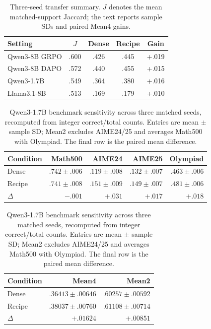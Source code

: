 \documentclass[5p,times]{elsarticle}
\begin{document}
\begin{table}[t]
\centering
\caption{Three-seed transfer summary. $J$ denotes the mean matched-support
Jaccard; the text reports sample SDs and paired Mean4 gains.}
\label{tab:transfer}
\small\setlength{\tabcolsep}{3.5pt}
\begin{tabular}{lcccc}
\toprule Setting & $J$ & Dense & Recipe & Gain\\
\midrule
Qwen3-8B GRPO & .600 & .426 & .445 & +.019\\
Qwen3-8B DAPO & .572 & .440 & .455 & +.015\\
Qwen3-1.7B & .549 & .364 & .380 & +.016\\
Llama3.1-8B & .513 & .169 & .179 & +.010\\
\bottomrule
\end{tabular}
\end{table}

\begin{table}[t]
\centering
\caption{Qwen3-1.7B benchmark sensitivity across three matched seeds, recomputed
from integer correct/total counts. Entries are mean $\pm$ sample SD; Mean2
excludes AIME24/25 and averages Math500 with Olympiad. The final row is the
paired mean difference.}
\label{tab:qwen17}
\scriptsize\setlength{\tabcolsep}{3.3pt}
\begin{tabular}{lrrrr}
\toprule Condition & Math500 & AIME24 & AIME25 & Olympiad\\
\midrule
Dense & $.742\pm.006$ & $.119\pm.008$ & $.132\pm.007$ & $.463\pm.006$\\
Recipe & $.741\pm.008$ & $.151\pm.009$ & $.149\pm.007$ & $.481\pm.006$\\
$\Delta$ & $-.001$ & $+.031$ & $+.017$ & $+.018$\\
\bottomrule
\end{tabular}
\par\smallskip
\begin{tabular}{lrr}
\toprule Condition & Mean4 & Mean2\\
\midrule
Dense & $.36413\pm.00646$ & $.60257\pm.00592$\\
Recipe & $.38037\pm.00760$ & $.61108\pm.00714$\\
$\Delta$ & $+.01624$ & $+.00851$\\
\bottomrule
\end{tabular}
\end{table}
\end{document}
